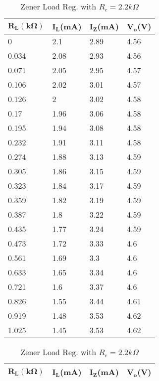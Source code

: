 \documentclass{scrartcl}
\newcommand{\1}{\mathbbm{1}}
\begin{document}
\begin{itemize}
\begin{table}[!htb]
    \begin{minipage}{.45\linewidth}
		\centering
			\begin{tabular}{|l|l|l|l|}
			\hline
				\textbf{$\pmb{R_L(k\Omega)}$} & \textbf{$\pmb{I_L}$(mA)} & 
				\textbf{$\pmb{I_Z}$(mA)} & \textbf{$\pmb{V_o}$(V)} \\ \hline
				0 & 2.1 & 2.89 & 4.56 \\ \hline
				0.034 & 2.08 & 2.93 & 4.56 \\ \hline
				0.071 & 2.05 & 2.95 & 4.57 \\ \hline
				0.106 & 2.02 & 3.01 & 4.57 \\ \hline
				0.126 & 2 & 3.02 & 4.58 \\ \hline
				0.17 & 1.96 & 3.06 & 4.58 \\ \hline
				0.195 & 1.94 & 3.08 & 4.58 \\ \hline
				0.232 & 1.91 & 3.11 & 4.58 \\ \hline
				0.274 & 1.88 & 3.13 & 4.59 \\ \hline
				0.305 & 1.86 & 3.15 & 4.59 \\ \hline
				0.323 & 1.84 & 3.17 & 4.59 \\ \hline
				0.359 & 1.82 & 3.19 & 4.59 \\ \hline
				0.387 & 1.8 & 3.22 & 4.59 \\ \hline
				0.435 & 1.77 & 3.24 & 4.59 \\ \hline
				0.473 & 1.72 & 3.33 & 4.6 \\ \hline
				0.561 & 1.69 & 3.3 & 4.6 \\ \hline
				0.633 & 1.65 & 3.34 & 4.6 \\ \hline
				0.721 & 1.6 & 3.37 & 4.6 \\ \hline
				0.826 & 1.55 & 3.44 & 4.61 \\ \hline
				0.919 & 1.48 & 3.53 & 4.62 \\ \hline
				1.025 & 1.45 & 3.53 & 4.62 \\ \hline
			\end{tabular}
			\caption{Zener Load Reg. with $R_c = 2.2 k\Omega$}
			\label{tab:ZDload2.2ohm}
    \end{minipage}%
    \begin{minipage}{.5\linewidth}
      \centering
    \begin{tabular}{|l|l|l|l|}
    \hline
        \textbf{$\pmb{R_L(k\Omega)}$} & \textbf{$\pmb{I_L}$(mA)} 
		& \textbf{$\pmb{I_Z}$(mA)} & \textbf{$\pmb{V_o}$(V)} \\ \hline

\end{tabular}
\end{minipage}
\end{table}
\end{itemize}
\end{document}
